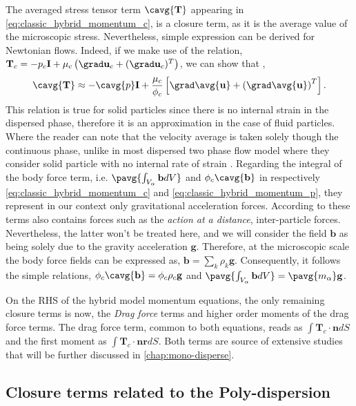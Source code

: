 The averaged stress tensor term $\cavg{\textbf{T}}$ appearing in \ref{eq:classic_hybrid_momentum_c}, is a closure term, as it is the average value of the microscopic stress. 
Nevertheless, simple expression can be derived for Newtonian flows. 
Indeed, if we make use of the relation, $\textbf{T}_c = -p_c\textbf{I} + \mu_c \left(\grad \textbf{u}_c+ (\grad \textbf{u}_c)^T\right)$, 
we can show that \citep{jackson2000dynamics}, 
\begin{equation*}
    \cavg{\textbf{T}} \approx - \cavg{p}\textbf{I} 
    + \frac{\mu_c}{\phi_c} \left[\grad \avg{\textbf{u}} + \left(\grad \avg{\textbf{u}}\right)^T\right].
\end{equation*}
This relation is true for solid particles since there is no internal strain in the dispersed phase, therefore it is an approximation in the case of fluid particles.  
Where the reader can note that the velocity average is taken solely though the continuous phase, unlike in most dispersed two phase flow model where they consider solid particle with no internal rate of strain \citep{jackson1997locally}. 
Regarding the integral of the body force term, i.e. $\pavg{\int_{V_\alpha} \textbf{b} dV}$ and $\phi_c\cavg{\textbf{b}}$ in respectively \ref{eq:classic_hybrid_momentum_c} and \ref{eq:classic_hybrid_momentum_p}, they represent in our context only gravitational acceleration forces. 
According to \citet{nott2011suspension} these terms also contains forces such as the \textit{action at a distance}, inter-particle forces.
Nevertheless, the latter won't be treated here, and we will consider the field $\textbf{b}$ as being solely due to the gravity acceleration $\textbf{g}$. 
Therefore, at the microscopic scale the body force fields can be expressed as, $\textbf{b} = \sum_{k} \rho_k \textbf{g}$. 
Consequently, it follows the simple relations, $\phi_c\cavg{\textbf{b}} = \phi_c \rho_c \textbf{g}$ and $\pavg{\int_{V_\alpha} \textbf{b} dV} = \pavg{m_\alpha}\textbf{g}$.  


On the RHS of the hybrid model momentum equations, the only remaining closure terms is now, the \textit{Drag force} terms and higher order moments of the drag force terms. 
The drag force term, common to both equations, reads as $\int \textbf{T}_c \cdot \textbf{n} dS$ and the first moment as $ \int \textbf{T}_c \cdot \textbf{nr} dS$. 
Both terms are source of extensive studies that will be further discussed in \ref{chap:mono-disperse}.

\subsection{Closure terms related to the Poly-dispersion}

